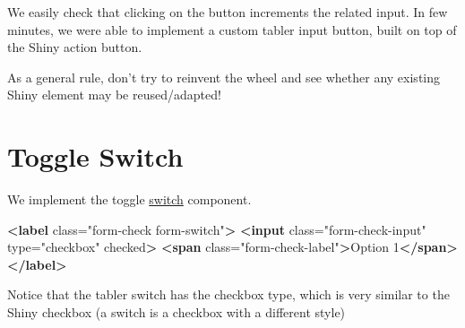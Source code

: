 \documentclass[]{book}
\newenvironment{Shaded}{\begin{snugshade}}{\end{snugshade}}
\newcommand{\ControlFlowTok}[1]{\textcolor[rgb]{0.13,0.29,0.53}{\textbf{#1}}}
\newcommand{\DataTypeTok}[1]{\textcolor[rgb]{0.13,0.29,0.53}{#1}}
\newcommand{\KeywordTok}[1]{\textcolor[rgb]{0.13,0.29,0.53}{\textbf{#1}}}
\newcommand{\NormalTok}[1]{#1}
\newcommand{\OperatorTok}[1]{\textcolor[rgb]{0.81,0.36,0.00}{\textbf{#1}}}
\newcommand{\OtherTok}[1]{\textcolor[rgb]{0.56,0.35,0.01}{#1}}
\newcommand{\StringTok}[1]{\textcolor[rgb]{0.31,0.60,0.02}{#1}}
\begin{document}
\begin{Shaded}
\end{Shaded}

We easily check that clicking on the button increments the related input. In few minutes, we were able to implement a custom tabler input button, built on top of the Shiny action button.

As a general rule, don't try to reinvent the wheel and see whether any existing Shiny element may be reused/adapted!

\hypertarget{toggle-switch}{%
\section{Toggle Switch}\label{toggle-switch}}

We implement the toggle \href{https://preview-dev.tabler.io/docs/form-elements.html\#custom-selectboxes}{switch} component.

\begin{Shaded}
\begin{Highlighting}[]
\KeywordTok{<label}\OtherTok{ class=}\StringTok{"form-check form-switch"}\KeywordTok{>}
  \KeywordTok{<input}\OtherTok{ class=}\StringTok{"form-check-input"}\OtherTok{ type=}\StringTok{"checkbox"}\OtherTok{ checked}\KeywordTok{>}
  \KeywordTok{<span}\OtherTok{ class=}\StringTok{"form-check-label"}\KeywordTok{>}\NormalTok{Option 1}\KeywordTok{</span>}
\KeywordTok{</label>}
\end{Highlighting}
\end{Shaded}

Notice that the tabler switch has the checkbox type, which is very similar to the Shiny checkbox (a switch is a checkbox with a different style)
\end{document}
